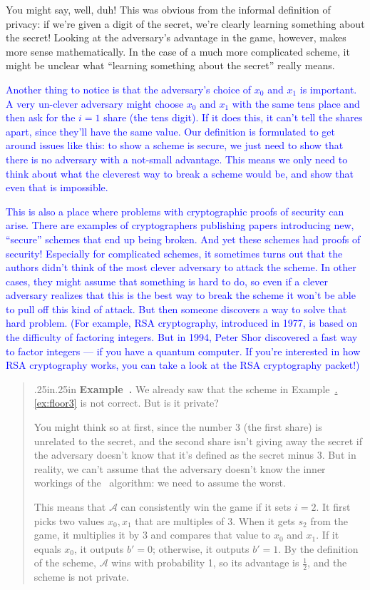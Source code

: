 \documentclass[12 pt]{article}
\def\A{\ensuremath{\mathcal{A}}}
\newcommand{\new}[1]{\textcolor{blue}{#1}}
\newcommand{\exref}[1]{\hyperref[#1]{\thesection.\ref*{#1}}}
\newcounter{example}[section]
\newenvironment{example}{\refstepcounter{example}\par\bigskip \begin{quotation}{}{\leftmargin .25in\rightmargin .25in}
    \noindent \textbf{Example~\thesection.\theexample }  \rmfamily}{\end{quotation}\par\bigskip}
\begin{document}
You might say, well, duh! This was obvious from the informal definition 
of privacy: if we're given a digit of the secret, we're clearly learning 
something about the secret! Looking at the adversary's advantage in the 
game, however, makes more sense mathematically. In the case of a much 
more complicated scheme, it might be unclear what ``learning something 
about the secret'' really means.

\new{Another thing to notice is that the adversary's choice of $x_0$ and $x_1$
is important. A very un-clever adversary might choose $x_0$ and $x_1$ with 
the same tens place and then ask for the $i=1$ share (the tens digit).
If it does this, it can't tell the shares apart, since they'll have the same
value. Our definition is formulated to get around issues like this: to 
show a scheme is secure, we just need to show that there is no adversary 
with a not-small advantage. This means we only need to think about what the 
cleverest way to break a scheme would be, and show that even that is 
impossible.}

\new{This is also a place where problems with cryptographic proofs of security 
can arise. There are examples of cryptographers publishing papers 
introducing new, ``secure'' schemes that end up being broken. And yet 
these schemes had proofs of security! Especially for complicated schemes, 
it sometimes turns out that the authors didn't think of the most clever 
adversary to attack the scheme. In other cases, they might assume that 
something is hard to do, so even if a clever adversary realizes that this 
is the best way to break the scheme it won't be able to pull off this 
kind of attack. But then someone discovers a way to solve that 
hard problem. (For example, RSA cryptography, introduced in 1977\cite{rsa},
is based on the difficulty of factoring integers. But in 1994, Peter Shor 
discovered a fast way to factor integers\cite{shor} --- if you have a 
quantum computer. If you're interested in how RSA cryptography works, 
you can take a look at the RSA cryptography packet!)}

\begin{example}
    We already saw that the scheme in Example~\exref{ex:floor3} is not correct.
    But is it private?

    You might think so at first, since the number 3 (the first share) is
    unrelated to the secret, and the second share isn't giving away the 
    secret if the adversary doesn't know that it's defined as the secret minus 3.
    But in reality, we can't assume that the adversary doesn't know the 
    inner workings of the \share~algorithm: we need to assume the worst.
    
    This means that $\A$ can consistently win the game if it sets $i = 2$.
    It first picks two values $x_0, x_1$ that are multiples of 3.
    When it gets $s_2$ from the game, it multiplies it by 3 and compares that 
    value to $x_0$ and $x_1$. If it equals $x_0$, it outputs $b' = 0$; 
    otherwise, it outputs $b' = 1$. By the definition of the scheme, $\A$ 
    wins with probability 1, so its advantage is $\frac{1}{2}$, and the 
    scheme is not private.
\end{example}
\end{document}
